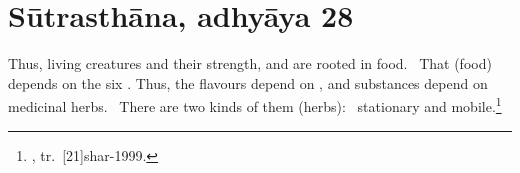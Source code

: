 \section{Sūtrasthāna, adhyāya 28}
    
\begin{translation}    
    \item [1] Thus, living creatures and their strength,
 and  are rooted in food.  That
(food) depends on the six . Thus, the flavours depend
on , and substances depend on medicinal herbs. 
There are two kinds of them (herbs):  stationary and 
mobile.\footnote{, tr.\ [21]{shar-1999}.}

\end{translation}